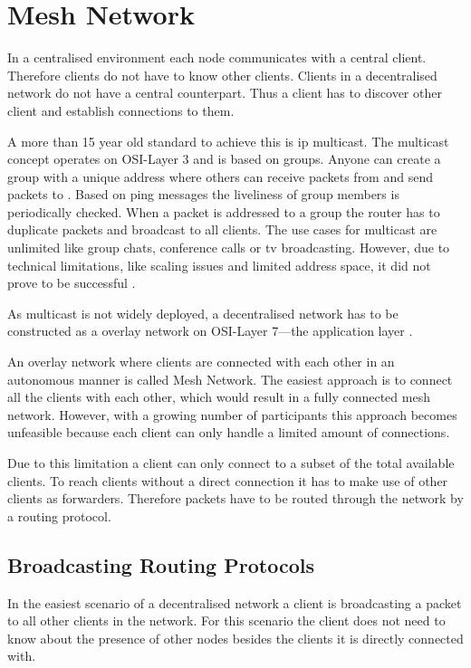 \section{Mesh Network}\label{sec:mesh-network}

In a centralised environment each node communicates with a central client. Therefore clients do not have to know other clients.
Clients in a decentralised network do not have a central counterpart. Thus a client has to discover other client and establish connections to them.

A more than 15 year old standard to achieve this is \gls{ip} multicast. The multicast concept operates on OSI-Layer 3 and is based on groups. Anyone can create a group with a unique address where others can receive packets from and send packets to \cite[pp. 484-485]{tanenbaum_wetherall_2011}. Based on ping messages the liveliness of group members is periodically checked. When a packet is addressed to a group the router has to duplicate packets and broadcast to all clients. 
The use cases for multicast are unlimited like group chats, conference calls or tv broadcasting.
However, due to technical limitations, like scaling issues and limited address space, it did not prove to be successful \cite{multicast}.

As multicast is not widely deployed, a decentralised network has to be constructed as a overlay network on OSI-Layer 7—the application layer \cite[\S1]{multicast-problems}.

An overlay network where clients are connected with each other in an autonomous manner is called Mesh Network. The easiest approach is to connect all the clients with each other, which would result in a fully connected mesh network. However, with a growing number of participants this approach becomes unfeasible because each client can only handle a limited amount of connections.

Due to this limitation a client can only connect to a subset of the total available clients. To reach clients without a direct connection it has to make use of other clients as forwarders. Therefore packets have to be routed through the network by a routing protocol.

\subsection{Broadcasting Routing Protocols}
In the easiest scenario of a decentralised network a client is broadcasting a packet to all other clients in the network. For this scenario the client does not need to know about the presence of other nodes besides the clients it is directly connected with.

